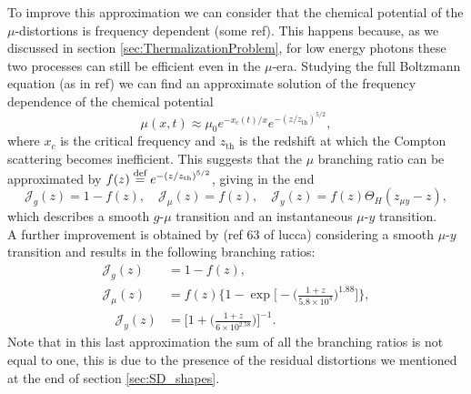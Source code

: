 To improve this approximation we can consider that the chemical potential of the $\mu$-distortions is frequency dependent (some ref). This happens because, as we discussed in section \ref{sec:ThermalizationProblem}, for low energy photons these two processes can still be efficient even in the $\mu$-era. Studying the full Boltzmann equation (as in ref) we can find an approximate solution of the frequency dependence of the chemical potential 
\begin{equation*}
    \label{eq:SD_mu_freq}
    \mu(x,t)\approx\mu_0e^{-x_c(t)/x}e^{-(z/z_{\text{th}})^{5/2}},
\end{equation*}
where $x_c$ is the critical frequency and $z_{\text{th}}$ is the redshift at which the Compton scattering becomes inefficient. This suggests that the $\mu$ branching ratio can be approximated by $f(z)\stackrel{\text{def}}{=} e^{-(z/z_{\text{th}})^{5/2}}$, giving in the end
\begin{equation}
    \mathcal{J}_g(z)=1-f(z),\quad \mathcal{J}_\mu(z)=f(z),\quad \mathcal{J}_y(z)=f(z)\Theta_{H}(z_{\mu y}-z),
\end{equation}
which describes a smooth $g$-$\mu$ transition and an instantaneous $\mu$-$ y$ transition.\\A further improvement is obtained by (ref 63 of lucca) considering a smooth $\mu$-$ y$ transition and results in the following branching ratios:
\begin{align}
    \mathcal{J}_g(z)&=1-f(z),\\ \mathcal{J}_\mu(z)&=f(z)\bigg\{1-\exp\bigg[-\bigg(\frac{1+z}{5.8\times10^4}\bigg)^{1.88}\bigg]\bigg\},\\\quad \mathcal{J}_y(z)&=\bigg[1+\bigg(\frac{1+z}{6\times10^{2.58}}\bigg)\bigg]^{-1}.
\end{align}
Note that in this last approximation the sum of all the branching ratios is not equal to one, this is due to the presence of the residual distortions we mentioned at the end of section \ref{sec:SD_shapes}. 

